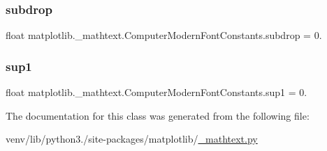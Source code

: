 \subsubsection{\texorpdfstring{subdrop}{subdrop}}
{\footnotesize\ttfamily float matplotlib.\+\_\+mathtext.\+Computer\+Modern\+Font\+Constants.\+subdrop = 0.\hspace{0.3cm}{\ttfamily [static]}}

\mbox{\label{classmatplotlib_1_1__mathtext_1_1ComputerModernFontConstants_a40dfe2995c9334ca7185a52b03c4fa7a}} 
\subsubsection{\texorpdfstring{sup1}{sup1}}
{\footnotesize\ttfamily float matplotlib.\+\_\+mathtext.\+Computer\+Modern\+Font\+Constants.\+sup1 = 0.\hspace{0.3cm}{\ttfamily [static]}}



The documentation for this class was generated from the following file\+:\begin{DoxyCompactItemize}
\item 
venv/lib/python3./site-\/packages/matplotlib/\hyperlink{__mathtext_8py}{\+\_\+mathtext.\+py}\end{DoxyCompactItemize}
